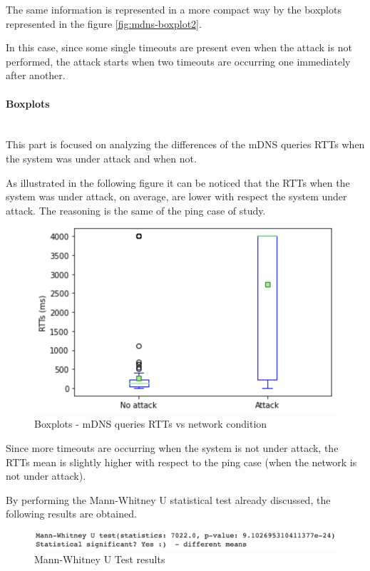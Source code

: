 \documentclass[fleqn, 11pt]{SelfArx} %
\begin{document}
The same information is represented in a more compact way by the boxplots represented in the figure \ref{fig:mdns-boxplot2}.

In this case, since some single timeouts are present even when the attack is not performed, the attack starts when two timeouts are occurring one immediately after another. 

\paragraph{Boxplots}\mbox{}\\
This part is focused on analyzing the differences of the mDNS queries RTTs when the system was under attack and when not.

As illustrated in the following figure it can be noticed that the RTTs when the system was under attack, on average, are lower with respect the system under attack.
The reasoning is the same of the ping case of study.

\begin{figure}\centering
    \includegraphics[width=\linewidth]{./mdns/mdns-boxplot1.png}
    \caption{Boxplots - mDNS queries RTTs vs network condition}
	\label{fig:mdns-boxplot1}
\end{figure}

Since more timeouts are occurring when the system is not under attack, the RTTs mean is slightly higher with respect to the ping case (when the network is not under attack).

By performing the Mann-Whitney U statistical test already discussed, the following results are obtained.
\begin{figure}[H]\centering
    \includegraphics[width=\linewidth]{./mdns/mannwhitneyu2.png}
    \caption{Mann-Whitney U Test results}
	\label{fig:mannwhitneyu2}
\end{figure}
\end{document}
